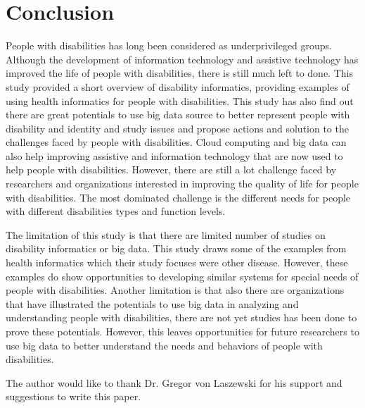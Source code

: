 \documentclass[sigconf]{acmart}
\begin{document}
\section{Conclusion}
People with disabilities has long been considered as underprivileged groups. Although the development of information
technology and assistive technology has improved the life of people with disabilities, there is still much left to
done. This study provided a short overview of disability informatics, providing examples of using health informatics
for people with disabilities. This study has also find out there are great potentials to use big data source to
better represent people with disability and identity and study issues and propose actions and solution to the
challenges faced by people with disabilities. Cloud computing and big data can also help improving assistive and
information technology that are now used to help people with disabilities.
However, there are still a lot challenge faced by researchers and organizations interested in improving the quality
of life for people with disabilities. The most dominated challenge is the different needs for people with different
disabilities types and function levels. 

The limitation of this study is that there are limited number of studies on disability informatics or big data. This
study draws some of the examples from health informatics which their study focuses were other disease. However, these
examples do show opportunities to developing similar systems for special needs of people with disabilities. Another
limitation is that also there are organizations that have illustrated the potentials to use big data in analyzing and
understanding people with disabilities, there are not yet studies has been done to prove these potentials. However,
this leaves opportunities for future researchers to use big data to better understand the needs and behaviors of
people with disabilities. 


\begin{acks}

  The author would like to thank Dr. Gregor von Laszewski for his
  support and suggestions to write this paper.

\end{acks}


 

\appendix
\end{document}
